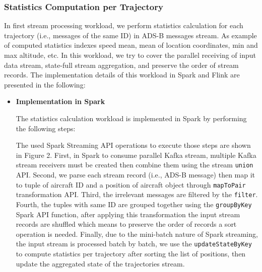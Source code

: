 \documentclass[]{article}
\begin{document}
\subsubsection{Statistics Computation per Trajectory}
In first stream processing workload, we perform statistics calculation for each trajectory (i.e.,  messages of the same ID) in ADS-B messages stream. As example of computed statistics indexes speed mean, mean of location coordinates, min and max altitude, etc. In this workload, we try to cover 
the parallel receiving of input data stream, state-full stream aggregation, and preserve the order of stream records.
The implementation details of this workload in Spark and Flink are presented in the following: 
\begin{itemize}
\item {\bf{Implementation in Spark }}

The statistics calculation workload is implemented in Spark by performing the following steps: 

\par The used Spark Streaming API operations to execute those steps are shown in Figure 2. First, in Spark to consume parallel Kafka stream, multiple Kafka stream receivers must be created then combine them using the stream \texttt{union} API. Second, we parse each stream record (i.e., ADS-B message) then map it to tuple of aircraft ID and a position of aircraft object through \texttt{mapToPair} transformation API. Third, the irrelevant messages are filtered by the \texttt{filter}. Fourth, the tuples with same ID are grouped together using the \texttt{groupByKey} Spark API function, after applying this transformation the input stream records are shuffled which means to preserve the order of records a sort operation is needed. Finally, due to the mini-batch nature of Spark streaming, the input stream is processed batch by batch, we use the  \texttt{updateStateByKey} to compute statistics per trajectory after sorting the list of positions, then update the aggregated state of the trajectories stream.


\end{itemize}
\end{document}
